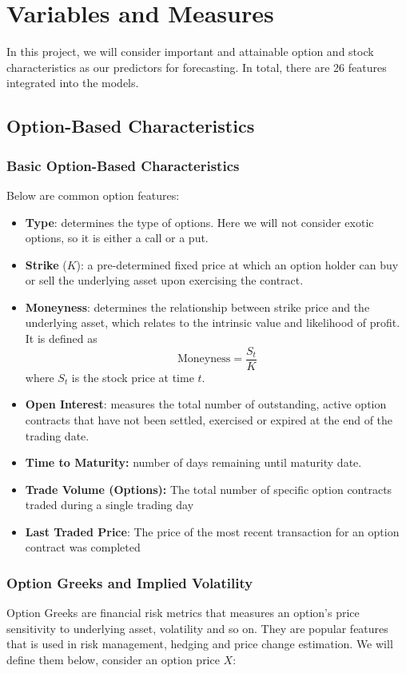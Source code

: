 \documentclass[oneside, 12pt]{article}
\newcommand*{\1}{\text{\scalebox{1.1}{\usefont{U}{bbold}{m}{n}1}}}
\begin{document}
\section{Variables and Measures}
In this project, we will consider important and attainable option and stock characteristics as our predictors for forecasting. In total, there are 26 features integrated into the models. 
\subsection{Option-Based Characteristics}
\subsubsection{Basic Option-Based Characteristics}
Below are common option features:
\begin{itemize}
\item \textbf{Type}: determines the type of options. Here we will not consider exotic options, so it is either a call or a put. 
\item \textbf{Strike} ($K$): a pre-determined fixed price at which an option holder can buy or sell the underlying asset upon exercising the contract. 
\item \textbf{Moneyness}: determines the relationship between strike price and the underlying asset, which relates to the intrinsic value and likelihood of profit. It is defined as 
$$
\mathrm{Moneyness} = \frac{S_t}{K}
$$
where $S_t$ is the stock price at time $t$. 
\item \textbf{Open Interest}: measures the total number of outstanding, active option contracts that have not been settled, exercised or expired at the end of the trading date. 
\item \textbf{Time to Maturity:} number of days remaining until maturity date. 
\item \textbf{Trade Volume (Options):} The total number of specific option contracts traded during a single trading day
\item \textbf{Last Traded Price}: The price of the most recent transaction for an option contract was completed 
\end{itemize}

\subsubsection{Option Greeks and Implied Volatility}
Option Greeks are financial risk metrics that measures an option's price sensitivity to underlying asset, volatility and so on. They are popular features that is used in risk management, hedging and price change estimation. We will define them below, consider an option price $X$:
\end{document}
